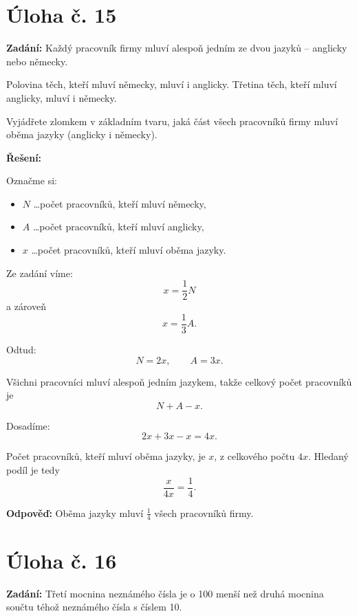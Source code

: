 \documentclass[12pt,a4paper]{article}
\begin{document}
\newpage
\section*{Úloha č. 15}

\textbf{Zadání:}  
Každý pracovník firmy mluví alespoň jedním ze dvou jazyků – anglicky nebo německy.

Polovina těch, kteří mluví německy, mluví i anglicky.  
Třetina těch, kteří mluví anglicky, mluví i německy.

Vyjádřete zlomkem v základním tvaru, jaká část všech pracovníků firmy mluví oběma jazyky (anglicky i německy).

\bigskip

\textbf{Řešení:}

Označme si:
\begin{itemize}
    \item \(N\) \dots počet pracovníků, kteří mluví německy,
    \item \(A\) \dots počet pracovníků, kteří mluví anglicky,
    \item \(x\) \dots počet pracovníků, kteří mluví oběma jazyky.
\end{itemize}

Ze zadání víme:
\[
x=\frac{1}{2}N
\]
a zároveň
\[
x=\frac{1}{3}A.
\]

Odtud:
\[
N=2x,\qquad A=3x.
\]

Všichni pracovníci mluví alespoň jedním jazykem, takže celkový počet pracovníků je
\[
N+A-x.
\]

Dosadíme:
\[
2x+3x-x=4x.
\]

Počet pracovníků, kteří mluví oběma jazyky, je \(x\), z celkového počtu \(4x\). Hledaný podíl je tedy
\[
\frac{x}{4x}=\frac{1}{4}.
\]

\bigskip

\textbf{Odpověď:}  
Oběma jazyky mluví \(\frac{1}{4}\) všech pracovníků firmy.



\newpage
\section*{Úloha č. 16}

\textbf{Zadání:}  
Třetí mocnina neznámého čísla je o 100 menší než druhá mocnina součtu téhož neznámého čísla s číslem 10.
\end{document}
